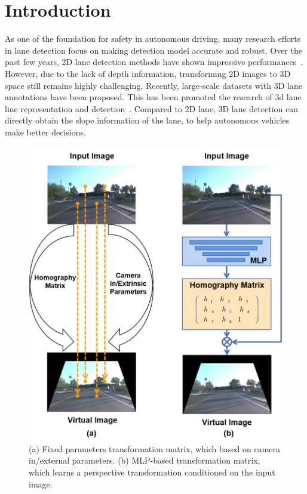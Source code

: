 \section{Introduction}
\label{sec:intro}

As one of the foundation for safety in autonomous driving, many research efforts in lane detection focus on making detection model accurate and robust.
Over the past few years, 2D lane detection methods have shown impressive performances~\cite{jin2022eigenlanes, hou2019learning, liu2021end, wang2022keypoint, huang2023anchor3dlane}.
However, due to the lack of depth information, transforming 2D images to 3D space still remains highly challenging.
Recently, large-scale datasets with 3D lane annotations have been proposed.
This has been promoted the research of 3d lane line representation and detection~\cite{chen2022persformer, efrat20203d, garnett20193d, guo2020gen, liu2022learning, yan2022once, huang2023anchor3dlane}.
Compared to 2D lane, 3D lane detection can directly obtain the slope information of the lane, to help autonomous vehicles make better decisions.


\begin{figure}[ht]
    \centering
    \includegraphics[width=0.8\linewidth]{asset/fvhnet}
    \caption{(a) Fixed parameters transformation matrix, which based on camera in/external parameters.
        (b) MLP-based transformation matrix, which learns a perspective transformation conditioned on the input image.}
    \label{fig:intro}
\end{figure}

